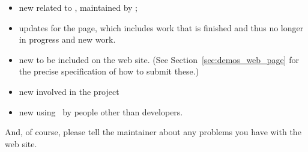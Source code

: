\begin{itemize}
   \item new
         related to \cgal, maintained by
         ;
   \item updates for the
         page, which includes work that is finished and thus no longer in
         progress and new work.
   \item new
         to be included on the web site. (See Section~\ref{sec:demos_web_page}
         for the precise specification of how to submit these.)
   \item new
         involved in the project
   \item new
         using \cgal\ by people other than developers.
\end{itemize}

And, of course, please tell the maintainer about any problems you have
with the web site.

